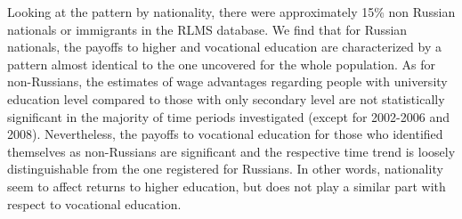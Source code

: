 \documentclass[12pt,a4paper]{article}
\numberwithin{equation}{section}
\begin{document}
Looking at the pattern by nationality, there were approximately 15\% non Russian nationals or immigrants in the RLMS database. We find that for Russian nationals, the payoffs to higher and vocational education are characterized by a pattern almost identical to the one uncovered for the whole population. As for non-Russians, the estimates of wage advantages regarding people with university education level compared to those with only secondary level are not statistically significant in the majority of time periods investigated (except for 2002-2006 and 2008). Nevertheless, the payoffs to vocational education for those who identified themselves as non-Russians are significant and the respective time trend is loosely distinguishable from the one registered for Russians. In other words, nationality seem to affect returns to higher education, but does not play a similar part with respect to vocational education.
\end{document}
